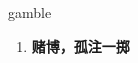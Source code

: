 
\begin{frame}
{\huge gamble}
\begin{center}
\begin{enumerate}\Large
  \item \textbf{赌博，孤注一掷}
\end{enumerate}
\end{center}
\end{frame}
